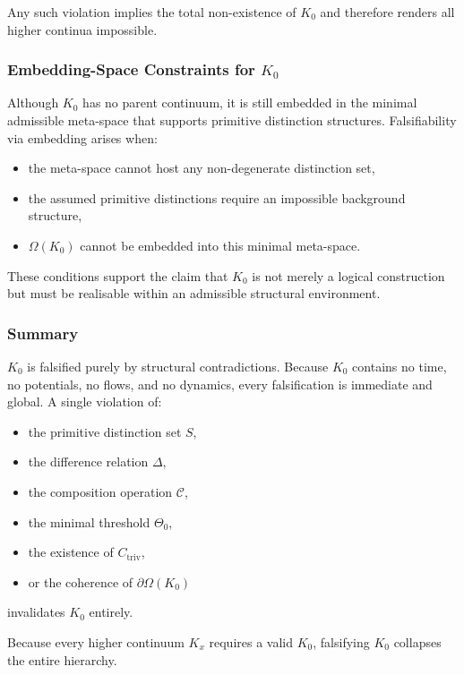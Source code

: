 Any such violation implies the total non-existence of $K_0$ and therefore
renders all higher continua impossible.



\subsubsection{Embedding-Space Constraints for \texorpdfstring{$K_0$}{K_0}}

Although $K_0$ has no parent continuum, it is still embedded in the
minimal admissible meta-space that supports primitive distinction
structures.
Falsifiability via embedding arises when:

\begin{itemize}
    \item the meta-space cannot host any non-degenerate distinction set,
    \item the assumed primitive distinctions require an impossible
          background structure,
    \item $\Omega(K_0)$ cannot be embedded into this minimal meta-space.
\end{itemize}

These conditions support the claim that $K_0$ is not merely a logical
construction but must be realisable within an admissible structural
environment.



\subsubsection{Summary}

$K_0$ is falsified purely by structural contradictions.
Because $K_0$ contains no time, no potentials, no flows, and no
dynamics, every falsification is immediate and global.
A single violation of:

\begin{itemize}
    \item the primitive distinction set $S$,
    \item the difference relation $\Delta$,
    \item the composition operation $\mathcal{C}$,
    \item the minimal threshold $\Theta_0$,
    \item the existence of $C_{\mathrm{triv}}$,
    \item or the coherence of $\partial\Omega(K_0)$
\end{itemize}

invalidates $K_0$ entirely.

Because every higher continuum $K_x$ requires a valid $K_0$,
falsifying $K_0$ collapses the entire hierarchy.
